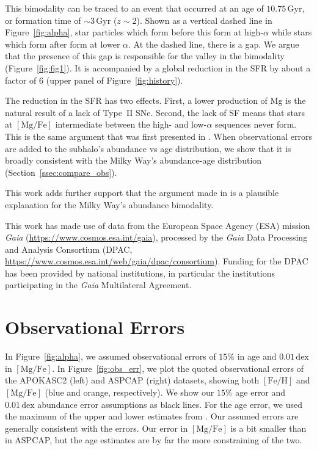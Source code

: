 \documentclass[linenumbers, twocolumn]{aastex631}
\newcommand{\Gyr}{\ensuremath{\textrm{Gyr}}}
\newcommand{\FeH}{\ensuremath{[\textrm{Fe}/\textrm{H}]}}
\newcommand{\MgFe}{\ensuremath{[\textrm{Mg}/\textrm{Fe}]}}
\newcommand{\dex}{\ensuremath{\textrm{dex}}}
\begin{document}
This bimodality can be traced to an event that occurred at an age of $10.75\,\Gyr$, or formation time of $\sim3\,\Gyr$ ($z\sim2$). Shown as a vertical dashed line in Figure~\ref{fig:alpha}, star particles which form before this form at high-$\alpha$ while stars which form after form at lower $\alpha$. At the dashed line, there is a gap. We argue that the presence of this gap is responsible for the valley in the bimodality (Figure~\ref{fig:fig1}). It is accompanied by a global reduction in the SFR by about a factor of 6 (upper panel of Figure~\ref{fig:history}).

The reduction in the SFR has two effects. First, a lower production of Mg is the natural result of a lack of Type~II SNe. Second, the lack of SF means that stars at \MgFe{} intermediate between the high- and low-$\alpha$ sequences never form. This is the same argument that was first presented in \citet{2024arXiv240707985B}. When observational errors are added to the subhalo's abundance vs age distribution, we show that it is broadly consistent with the Milky Way's abundance-age distribution (Section~\ref{ssec:compare_obs}).

This work adds further support that the argument made in \citet{2024arXiv240707985B} is a plausible explanation for the Milky Way's abundance bimodality.

\begin{acknowledgements}
This work has made use of data from the European Space Agency (ESA) mission {\it Gaia} (\url{https://www.cosmos.esa.int/gaia}), processed by the {\it Gaia} Data Processing and Analysis Consortium (DPAC, \url{https://www.cosmos.esa.int/web/gaia/dpac/consortium}). Funding for the DPAC has been provided by national institutions, in particular the institutions participating in the {\it Gaia} Multilateral Agreement.
\end{acknowledgements}

{}


\appendix

\section{Observational Errors}\label{app:obs_err}
In Figure~\ref{fig:alpha}, we assumed observational errors of $15\%$ in age and $0.01\,\dex$ in \MgFe{}. In Figure~\ref{fig:obs_err}, we plot the quoted observational errors of the APOKASC2 (left) and ASPCAP (right) datasets, showing both \FeH{} and \MgFe{} (blue and orange, respectively). We show our $15\%$ age error and $0.01\,\dex$ abundance error assumptions as black lines. For the age error, we used the maximum of the upper and lower estimates from \citet{2018ApJS..239...32P}. Our assumed errors are generally consistent with the errors. Our error in \MgFe{} is a bit smaller than in ASPCAP, but the age estimates are by far the more constraining of the two.
\end{document}
